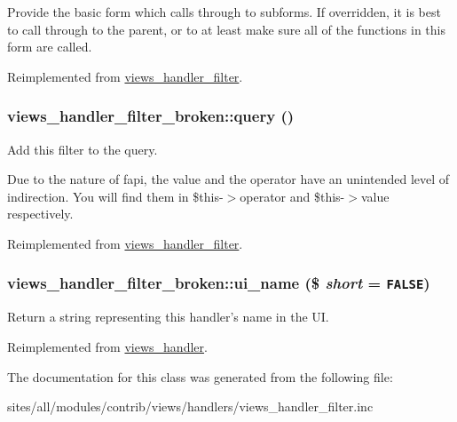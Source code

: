 Provide the basic form which calls through to subforms. If overridden, it is best to call through to the parent, or to at least make sure all of the functions in this form are called. 

Reimplemented from \hyperlink{classviews__handler__filter_f14c69367162057a32709a6340de0988}{views\_\-handler\_\-filter}.\hypertarget{classviews__handler__filter__broken_15895a67b79ccabcab4d21945a38477b}{
\subsubsection[{query}]{\setlength{\rightskip}{0pt plus 5cm}views\_\-handler\_\-filter\_\-broken::query ()}}
\label{classviews__handler__filter__broken_15895a67b79ccabcab4d21945a38477b}


Add this filter to the query.

Due to the nature of fapi, the value and the operator have an unintended level of indirection. You will find them in \$this-$>$operator and \$this-$>$value respectively. 

Reimplemented from \hyperlink{classviews__handler__filter_8e513b3abbc2559f37b550ca4957b4ae}{views\_\-handler\_\-filter}.\hypertarget{classviews__handler__filter__broken_199df5434e076ecc6889082a83f2e266}{
\subsubsection[{ui\_\-name}]{\setlength{\rightskip}{0pt plus 5cm}views\_\-handler\_\-filter\_\-broken::ui\_\-name (\$ {\em short} = {\tt FALSE})}}
\label{classviews__handler__filter__broken_199df5434e076ecc6889082a83f2e266}


Return a string representing this handler's name in the UI. 

Reimplemented from \hyperlink{classviews__handler_e81019ed08d9c3f5bca3d16c69e7b39f}{views\_\-handler}.

The documentation for this class was generated from the following file:\begin{CompactItemize}
\item 
sites/all/modules/contrib/views/handlers/views\_\-handler\_\-filter.inc\end{CompactItemize}
